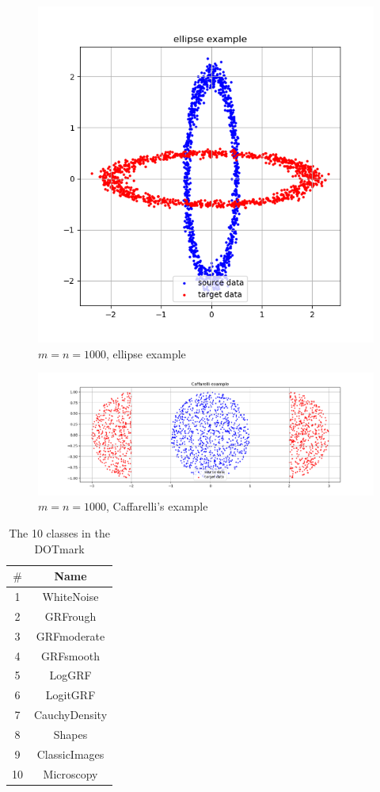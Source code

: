 \documentclass{article}
\begin{document}
\begin{figure}[h]
  \centering
  \includegraphics[width=.5\textwidth]{ellip.png}
  \captionsetup{justification=centering}
  \caption{\label{fig:ellip}$m=n=1000$, ellipse example}
\end{figure}
\begin{figure}[h]
  \centering
  \includegraphics[width=.9\textwidth]{caffa.png}
  \captionsetup{justification=centering}
  \caption{\label{fig:caffa}$m=n=1000$, Caffarelli’s example}
\end{figure}
\begin{table}[H]
  \centering
  \begin{tabular}{|c|c|}
  \hline
  $\#$&Name\\
  \hline
  \hline
  1&WhiteNoise\\
  2&GRFrough\\
  3&GRFmoderate\\
  4&GRFsmooth\\
  5&LogGRF\\
  6&LogitGRF\\
  7&CauchyDensity\\
  8&Shapes\\
  9&ClassicImages\\
  10&Microscopy\\
  \hline
  \end{tabular}
  \caption{\label{tab:table1}The 10 classes in the DOTmark}
\end{table}
\end{document}
